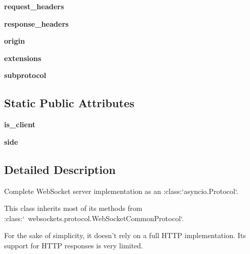 \begin{DoxyCompactItemize}
\mbox{\label{classwebsockets_1_1server_1_1_web_socket_server_protocol_ae9bd3318d3e2b3816dc33d99d05a47cd}} 
{\bfseries request\+\_\+headers}
\item 
\mbox{\label{classwebsockets_1_1server_1_1_web_socket_server_protocol_a5e799db3716496103ac27b09578b7067}} 
{\bfseries response\+\_\+headers}
\item 
\mbox{\label{classwebsockets_1_1server_1_1_web_socket_server_protocol_ac30456924791197aebb150250fa4503e}} 
{\bfseries origin}
\item 
\mbox{\label{classwebsockets_1_1server_1_1_web_socket_server_protocol_ad1102587fe6dafcabd893b5fd94742e9}} 
{\bfseries extensions}
\item 
\mbox{\label{classwebsockets_1_1server_1_1_web_socket_server_protocol_a28f5bed63a45d982eba36d00a084d32f}} 
{\bfseries subprotocol}
\end{DoxyCompactItemize}
\subsection*{Static Public Attributes}
\begin{DoxyCompactItemize}
\item 
\mbox{\label{classwebsockets_1_1server_1_1_web_socket_server_protocol_a571a924e8d3ae5dba5f220052c9469fc}} 
{\bfseries is\+\_\+client}
\item 
\mbox{\label{classwebsockets_1_1server_1_1_web_socket_server_protocol_abf9825c8d32c653a3c4e9e7a77b05222}} 
{\bfseries side}
\end{DoxyCompactItemize}


\subsection{Detailed Description}
\begin{DoxyVerb}Complete WebSocket server implementation as an :class:`asyncio.Protocol`.

This class inherits most of its methods from
:class:`~websockets.protocol.WebSocketCommonProtocol`.

For the sake of simplicity, it doesn't rely on a full HTTP implementation.
Its support for HTTP responses is very limited.\end{DoxyVerb}
 

